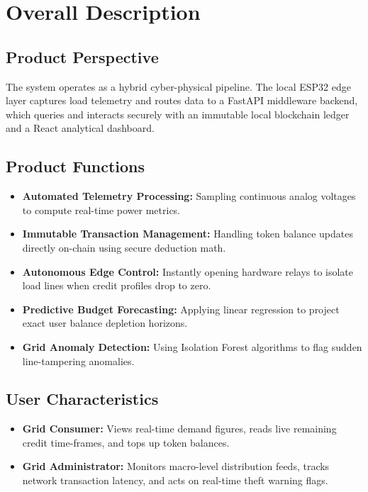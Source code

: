 \section{Overall Description}

\subsection{Product Perspective}
The system operates as a hybrid cyber-physical pipeline. The local ESP32 edge layer captures load telemetry and routes data to a FastAPI middleware backend, which queries and interacts securely with an immutable local blockchain ledger and a React analytical dashboard.

\subsection{Product Functions}
\begin{itemize}[leftmargin=*]
  \item \textbf{Automated Telemetry Processing:} Sampling continuous analog voltages to compute real-time power metrics.
  \item \textbf{Immutable Transaction Management:} Handling token balance updates directly on-chain using secure deduction math.
  \item \textbf{Autonomous Edge Control:} Instantly opening hardware relays to isolate load lines when credit profiles drop to zero.
  \item \textbf{Predictive Budget Forecasting:} Applying linear regression to project exact user balance depletion horizons.
  \item \textbf{Grid Anomaly Detection:} Using Isolation Forest algorithms to flag sudden line-tampering anomalies.
\end{itemize}

\subsection{User Characteristics}
\begin{itemize}[leftmargin=*]
  \item \textbf{Grid Consumer:} Views real-time demand figures, reads live remaining credit time-frames, and tops up token balances.
  \item \textbf{Grid Administrator:} Monitors macro-level distribution feeds, tracks network transaction latency, and acts on real-time theft warning flags.
\end{itemize}

